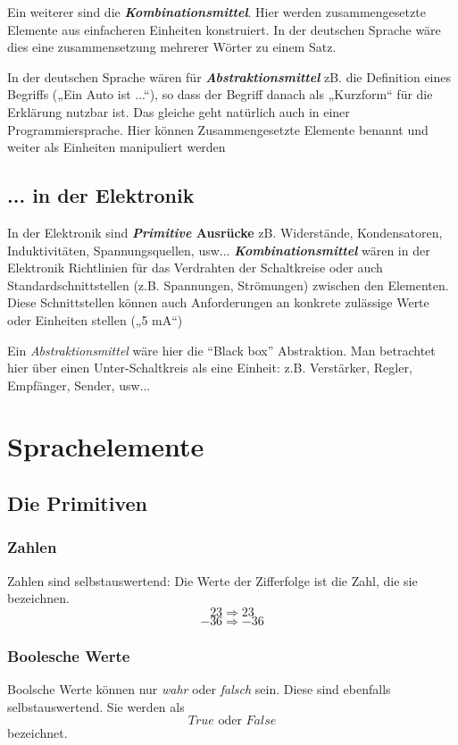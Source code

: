 Ein weiterer sind die \textbf{\textit{Kombinationsmittel}}. Hier werden zusammengesetzte Elemente aus einfacheren Einheiten konstruiert. In der deutschen Sprache wäre dies eine zusammensetzung mehrerer Wörter zu einem Satz.

In der deutschen Sprache wären für \textbf{\textit{Abstraktionsmittel}} zB. die Definition eines Begriffs („Ein Auto ist ...“), so dass der Begriff danach als „Kurzform“ für die Erklärung nutzbar ist. Das gleiche geht natürlich auch in einer Programmiersprache. Hier können Zusammengesetzte Elemente benannt und weiter als Einheiten manipuliert werden

\subsection{... in der Elektronik}

In der Elektronik sind \textbf{\textit{Primitive} Ausrücke} zB. Widerstände, Kondensatoren, Induktivitäten, Spannungsquellen, usw...
\textbf{\textit{Kombinationsmittel}} wären in der Elektronik Richtlinien für das Verdrahten der Schaltkreise oder auch Standardschnittstellen (z.B. Spannungen, Strömungen) zwischen den Elementen. Diese Schnittstellen können auch Anforderungen an konkrete zulässige Werte oder Einheiten stellen („5 mA“)

Ein {\textit{Abstraktionsmittel}} wäre hier die “Black box” Abstraktion. Man betrachtet hier über einen Unter-Schaltkreis als eine Einheit: z.B. Verstärker, Regler, Empfänger, Sender, usw...

\section{Sprachelemente}

\subsection{Die Primitiven}
\subsubsection{Zahlen}
Zahlen sind selbstauswertend: Die Werte der Zifferfolge ist die Zahl, die sie bezeichnen.
$$ 23 \Rightarrow 23 $$
$$ -36 \Rightarrow -36 $$

\subsubsection{Boolesche Werte}
Boolsche Werte können nur \textit{wahr} oder \textit{falsch} sein. Diese sind ebenfalls
selbstauswertend. Sie werden als
$$ True \text{ oder } False $$
bezeichnet.
